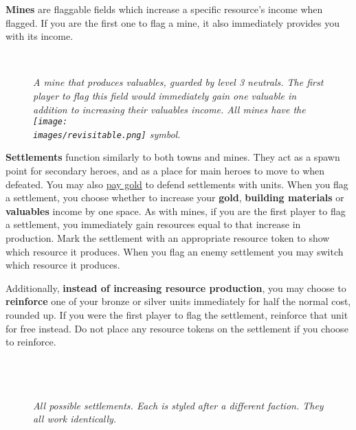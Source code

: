 \textbf{Mines} are flaggable fields which increase a specific resource's income when flagged.
If you are the first one to flag a mine, it also immediately provides you with its income.

\begin{figure}[h]
\centering
{}\\
\caption{\textit{A mine that produces valuables, guarded by level 3 neutrals.
  The first player to flag this field would immediately gain one valuable in addition to increasing their valuables income.
  All mines have the \texttt{[image: \\images/revisitable.png]} symbol.}}
\end{figure}

\textbf{Settlements} function similarly to both towns and mines.
They act as a spawn point for secondary heroes, and as a place for main heroes to move to when defeated.
You may also \hyperlink{Town}{pay gold} to defend settlements with units.
When you flag a settlement, you choose whether to increase your \textbf{gold}, \textbf{building materials} or \textbf{valuables} income by one space.
As with mines, if you are the first player to flag a settlement, you immediately gain resources equal to that increase in production.
Mark the settlement with an appropriate resource token to show which resource it produces.
When you flag an enemy settlement you may switch which resource it produces.\par
Additionally, \textbf{instead of increasing resource production}, you may choose to \textbf{reinforce} one of your bronze or silver units immediately for half the normal cost, rounded up.
If you were the first player to flag the settlement, reinforce that unit for free instead.
Do not place any resource tokens on the settlement if you choose to reinforce.
\begin{figure}[h]
\centering
{}\hfill%
\hfill%
\\
\vspace{4pt}
\hfill%
\hfill%
\\
\vspace{4pt}
\\%
\vspace{4pt}
\textit{All possible settlements.
  Each is styled after a different faction.
  They all work identically.}
\end{figure}
\bigbreak

